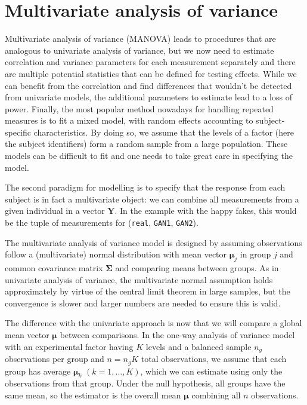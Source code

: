 \documentclass[
  11pt,
  letterpaper,
]{scrbook}
\theoremstyle{definition}
\theoremstyle{definition}
\theoremstyle{remark}
\begin{document}

\chapter{Multivariate analysis of
variance}\label{multivariate-analysis-of-variance}

Multivariate analysis of variance (MANOVA) leads to procedures that are
analogous to univariate analysis of variance, but we now need to
estimate correlation and variance parameters for each measurement
separately and there are multiple potential statistics that can be
defined for testing effects. While we can benefit from the correlation
and find differences that wouldn't be detected from univariate models,
the additional parameters to estimate lead to a loss of power. Finally,
the most popular method nowadays for handling repeated measures is to
fit a mixed model, with random effects accounting to subject-specific
characteristics. By doing so, we assume that the levels of a factor
(here the subject identifiers) form a random sample from a large
population. These models can be difficult to fit and one needs to take
great care in specifying the model.

The second paradigm for modelling is to specify that the response from
each subject is in fact a multivariate object: we can combine all
measurements from a given individual in a vector \(\boldsymbol{Y}\). In
the example with the happy fakes, this would be the tuple of
measurements for (\texttt{real}, \texttt{GAN1}, \texttt{GAN2}).

The multivariate analysis of variance model is designed by assuming
observations follow a (multivariate) normal distribution with mean
vector \(\boldsymbol{\mu}_j\) in group \(j\) and common covariance
matrix \(\boldsymbol{\Sigma}\) and comparing means between groups. As in
univariate analysis of variance, the multivariate normal assumption
holds approximately by virtue of the central limit theorem in large
samples, but the convergence is slower and larger numbers are needed to
ensure this is valid.

The difference with the univariate approach is now that we will compare
a global mean vector \(\boldsymbol{\mu}\) between comparisons. In the
one-way analysis of variance model with an experimental factor having
\(K\) levels and a balanced sample \(n_g\) observations per group and
\(n=n_gK\) total observations, we assume that each group has average
\(\boldsymbol{\mu}_k\) \((k=1, \ldots, K)\), which we can estimate using
only the observations from that group. Under the null hypothesis, all
groups have the same mean, so the estimator is the overall mean
\(\boldsymbol{\mu}\) combining all \(n\) observations.
\end{document}
